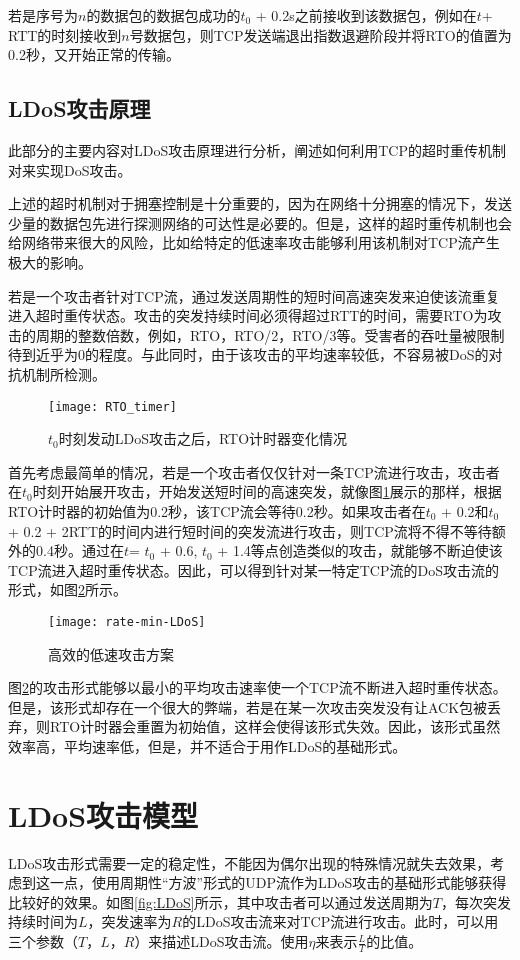 若是序号为$n$的数据包的数据包成功的$t_0$ + 0.2s之前接收到该数据包，例如在$t$+ RTT的时刻接收到$n$号数据包，则TCP发送端退出指数退避阶段并将RTO的值置为0.2秒，又开始正常的传输。

\subsection{LDoS攻击原理}
此部分的主要内容对LDoS攻击原理进行分析，阐述如何利用TCP的超时重传机制对来实现DoS攻击。

上述的超时机制对于拥塞控制是十分重要的，因为在网络十分拥塞的情况下，发送少量的数据包先进行探测网络的可达性是必要的。但是，这样的超时重传机制也会给网络带来很大的风险，比如给特定的低速率攻击能够利用该机制对TCP流产生极大的影响。

若是一个攻击者针对TCP流，通过发送周期性的短时间高速突发来迫使该流重复进入超时重传状态。攻击的突发持续时间必须得超过RTT的时间，需要RTO为攻击的周期的整数倍数，例如，RTO，RTO/2，RTO/3等。受害者的吞吐量被限制待到近乎为0的程度。与此同时，由于该攻击的平均速率较低，不容易被DoS的对抗机制所检测。

\begin{figure}
    \centering
    \texttt{[image: RTO\_timer]}
    \caption{$t_0$时刻发动LDoS攻击之后，RTO计时器变化情况}
    \label{fig:rto-timer}
\end{figure}

首先考虑最简单的情况，若是一个攻击者仅仅针对一条TCP流进行攻击，攻击者在$t_0$时刻开始展开攻击，开始发送短时间的高速突发，就像图\ref{fig:rto-timer}展示的那样，根据RTO计时器的初始值为0.2秒，该TCP流会等待0.2秒。如果攻击者在$t_0$ + 0.2和$t_0$ + 0.2 + 2RTT的时间内进行短时间的突发流进行攻击，则TCP流将不得不等待额外的0.4秒。通过在$t$= $t_0$ + 0.6, $t_0$ + 1.4等点创造类似的攻击，就能够不断迫使该TCP流进入超时重传状态。因此，可以得到针对某一特定TCP流的DoS攻击流的形式，如图\ref{fig:rate-min-LDoS}所示。

\begin{figure}
    \centering
    \texttt{[image: rate-min-LDoS]}
    \caption{高效的低速攻击方案}
    \label{fig:rate-min-LDoS}
\end{figure}

图\ref{fig:rate-min-LDoS}的攻击形式能够以最小的平均攻击速率使一个TCP流不断进入超时重传状态。但是，该形式却存在一个很大的弊端，若是在某一次攻击突发没有让ACK包被丢弃，则RTO计时器会重置为初始值，这样会使得该形式失效。因此，该形式虽然效率高，平均速率低，但是，并不适合于用作LDoS的基础形式。


\section{LDoS攻击模型}
\label{chap3:LDoS-model}
LDoS攻击形式需要一定的稳定性，不能因为偶尔出现的特殊情况就失去效果，考虑到这一点，使用周期性“方波”形式的UDP流作为LDoS攻击的基础形式能够获得比较好的效果。如图\ref{fig:LDoS}所示，其中攻击者可以通过发送周期为$T$，每次突发持续时间为$L$，突发速率为$R$的LDoS攻击流来对TCP流进行攻击。此时，可以用三个参数（$T$，$L$，$R$）来描述LDoS攻击流。使用$\eta$来表示$\frac{L}{T}$的比值。

